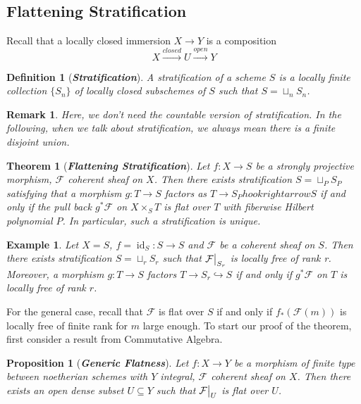 \documentclass{ctexart}
\newtheorem{definition}{Definition}[section]
\newtheorem{remark}{Remark}[section]
\newtheorem{theorem}{Theorem}[section]
\newtheorem{proposition}{Proposition}[section]
\newtheorem{example}{Example}[section]
\newcommand{\identity}{\operatorname{id}}
\begin{document}
\subsection{Flattening Stratification}
Recall that a locally closed immersion $X \longrightarrow Y$ is a composition
\begin{equation*}
    X \overset{closed}{\longrightarrow} U \overset{open}{\longrightarrow} Y
\end{equation*}
\begin{definition}[\textbf{\emph{Stratification}}]
    A stratification of a scheme $S$ is a locally finite collection $\{S_{n}\}$ of locally closed subschemes of $S$ such that $S = \sqcup_{n} S_{n}$.
\end{definition}
\begin{remark}
    Here, we don't need the countable version of stratification.
    In the following, when we talk about stratification, we always mean there is a finite disjoint union.
\end{remark}
\begin{theorem}[\textbf{\emph{Flattening Stratification}}]
    Let $f: X \longrightarrow S$ be a strongly projective morphism, $\mathcal{F}$ coherent sheaf on $X$.
    Then there exists stratification $S = \sqcup_{P} S_{P}$ satisfying that a morphism $g: T \longrightarrow S$ factors as $T \longrightarrow S_{P} hookrightarrow S$ if and only if the pull back $g^{\ast}\mathcal{F}$ on $X \times_{S} T$ is flat over $T$ with fiberwise Hilbert polynomial $P$.
    In particular, such a stratification is unique.
    \label{Theorem 13.4}
\end{theorem}
\begin{example}
    Let $X = S$, $f = \identity_{S}: S \longrightarrow S$ and $\mathcal{F}$ be a coherent sheaf on $S$.
    Then there exists stratification $S = \sqcup_{r} S_{r}$ such that $\mathcal{F}\big{|}_{S_{r}}$ is locally free of rank r.
    Moreover, a morphism $g: T \longrightarrow S$ factors $T \longrightarrow S_{r} \hookrightarrow S$ if and only if $g^{\ast}\mathcal{F}$ on $T$ is locally free of rank $r$.
\end{example}
For the general case, recall that $\mathcal{F}$ is flat over $S$ if and only if $f_{\ast}(\mathcal{F}(m))$ is locally free of finite rank for $m$ large enough.
To start our proof of the theorem, first consider a result from Commutative Algebra.
\begin{proposition}[\textbf{\emph{Generic Flatness}}]
    Let $f: X \longrightarrow Y$ be a morphism of finite type between noetherian schemes with $Y$ integral, $\mathcal{F}$ coherent sheaf on $X$.
    Then there exists an open dense subset $U \subseteq Y$ such that $\mathcal{F}\big{|}_{U}$ is flat over $U$.
    \label{Proposition 13.2}
\end{proposition}
\end{document}
